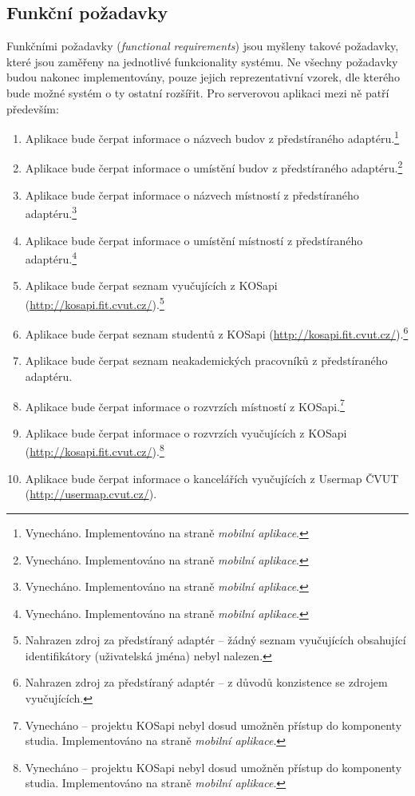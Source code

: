 \subsection{Funkční požadavky}
Funkčními požadavky (\textit{functional requirements}) jsou myšleny takové požadavky, které jsou zaměřeny na jednotlivé funkcionality systému. Ne všechny požadavky budou nakonec implementovány, pouze jejich reprezentativní vzorek, dle kterého bude možné systém o ty ostatní rozšířit. Pro serverovou aplikaci mezi ně patří především:
\begin{enumerate}
 \item Aplikace bude čerpat informace o názvech budov z předstíraného adaptéru.\footnote{Vynecháno. Implementováno na straně \textit{mobilní aplikace}.}
 \item Aplikace bude čerpat informace o umístění budov z předstíraného adaptéru.\footnote{Vynecháno. Implementováno na straně \textit{mobilní aplikace}.}
 \item Aplikace bude čerpat informace o názvech místností z předstíraného adaptéru.\footnote{Vynecháno. Implementováno na straně \textit{mobilní aplikace}.}
 \item Aplikace bude čerpat informace o umístění místností z předstíraného adaptéru.\footnote{Vynecháno. Implementováno na straně \textit{mobilní aplikace}.}
 \item Aplikace bude čerpat seznam vyučujících z KOSapi (\url{http://kosapi.fit.cvut.cz/}).\footnote{Nahrazen zdroj za předstíraný adaptér -- žádný seznam vyučujících obsahující identifikátory (uživatelská jména) nebyl nalezen.}
 \item Aplikace bude čerpat seznam studentů z KOSapi (\url{http://kosapi.fit.cvut.cz/}).\footnote{Nahrazen zdroj za předstíraný adaptér -- z důvodů konzistence se zdrojem vyučujících.}
 \item Aplikace bude čerpat seznam neakademických pracovníků z předstíraného adaptéru.
 \item Aplikace bude čerpat informace o rozvrzích místností z KOSapi.\footnote{Vynecháno -- projektu KOSapi nebyl dosud umožněn přístup do komponenty studia. Implementováno na straně \textit{mobilní aplikace}.}
 \item Aplikace bude čerpat informace o rozvrzích vyučujících z KOSapi (\url{http://kosapi.fit.cvut.cz/}).\footnote{Vynecháno -- projektu KOSapi nebyl dosud umožněn přístup do komponenty studia. Implementováno na straně \textit{mobilní aplikace}.}
 \item Aplikace bude čerpat informace o kancelářích vyučujících z Usermap ČVUT (\url{http://usermap.cvut.cz/}).

\end{enumerate}
